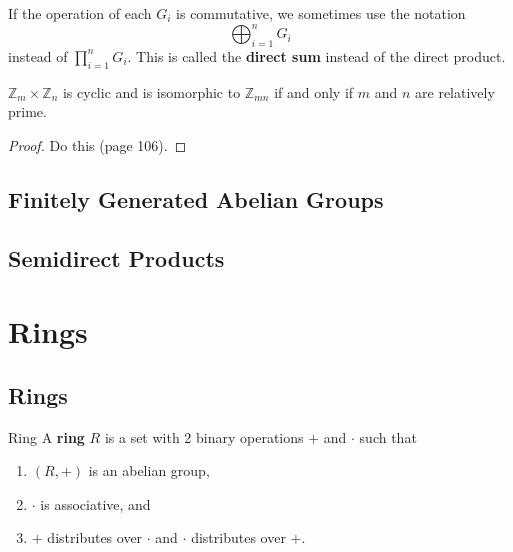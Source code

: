 \documentclass[10pt]{report}
\begin{document}
\begin{note}{}{}
	If the operation of each $G_i$ is commutative, we sometimes use the notation \[\bigoplus_{i=1}^n G_i\] instead of $\prod_{i=1}^n G_i$. This is called the \textbf{direct sum} instead of the direct product.
\end{note}

\begin{thrm}{}{}
$\mathbb{Z}_m \times \mathbb{Z}_n$ is cyclic and is isomorphic to $\mathbb{Z}_{mn}$ if and only if $m$ and $n$ are relatively prime.
\end{thrm}
\begin{proof}
	{\color{red}Do this (page 106).}
\end{proof}



\section{Finitely Generated Abelian Groups}



\section{Semidirect Products}





\chapter{Rings}


\section{Rings}

\begin{defn}{Ring}{}
A \textbf{ring} $R$ is a set with 2 binary operations $+$ and $\cdot$ such that
\begin{enumerate}
	\item $(R,+)$ is an abelian group,
	\item $\cdot$ is associative, and
	\item $+$ distributes over $\cdot$ and $\cdot$ distributes over $+$.
\end{enumerate}
\end{defn}
\end{document}
